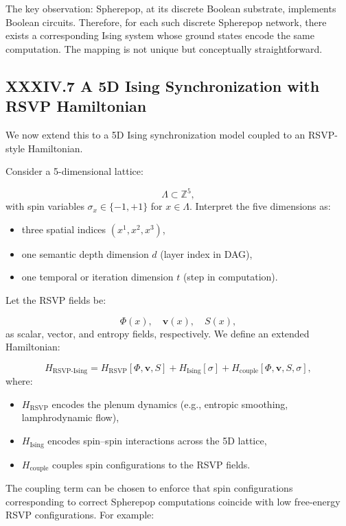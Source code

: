 \documentclass[11pt,letterpaper]{article}
\begin{document}
The key observation: Spherepop, at its discrete Boolean substrate, implements Boolean circuits. Therefore, for each such discrete Spherepop network, there exists a corresponding Ising system whose ground states encode the same computation. The mapping is not unique but conceptually straightforward.

\subsection{XXXIV.7 A 5D Ising Synchronization with RSVP Hamiltonian}

We now extend this to a 5D Ising synchronization model coupled to an RSVP-style Hamiltonian.

Consider a 5-dimensional lattice:

\[
\Lambda \subset \mathbb{Z}^5,
\]
with spin variables $\sigma_x \in \{-1,+1\}$ for $x \in \Lambda$. Interpret the five dimensions as:

\begin{itemize}
  \item three spatial indices $(x^1, x^2, x^3)$,
  \item one semantic depth dimension $d$ (layer index in DAG),
  \item one temporal or iteration dimension $t$ (step in computation).
\end{itemize}

Let the RSVP fields be:

\[
\Phi(x), \quad \mathbf{v}(x), \quad S(x),
\]
as scalar, vector, and entropy fields, respectively. We define an extended Hamiltonian:

\[
H_{\text{RSVP-Ising}} = H_{\text{RSVP}}[\Phi, \mathbf{v}, S]
+ H_{\text{Ising}}[\sigma]
+ H_{\text{couple}}[\Phi, \mathbf{v}, S, \sigma],
\]
where:

\begin{itemize}
  \item $H_{\text{RSVP}}$ encodes the plenum dynamics (e.g., entropic smoothing, lamphrodynamic flow),
  \item $H_{\text{Ising}}$ encodes spin--spin interactions across the 5D lattice,
  \item $H_{\text{couple}}$ couples spin configurations to the RSVP fields.
\end{itemize}

The coupling term can be chosen to enforce that spin configurations corresponding to correct Spherepop computations coincide with low free-energy RSVP configurations. For example:
\end{document}
